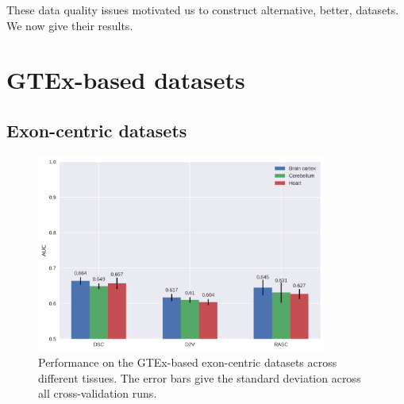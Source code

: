 These data quality issues motivated us to construct alternative, better, datasets. We now give their results.













\section{GTEx-based datasets} \label{sec:gtex}
\subsection{Exon-centric datasets} \label{subsec:gtex_exon}

\begin{figure}
	\centering\includegraphics[width=0.85\textwidth]{../visualizations/ch5-results/gtex_exon_barcharts.png} 
	\caption{Performance on the GTEx-based exon-centric datasets across different tissues. The error bars give the standard deviation across all cross-validation runs. }
	\label{fig:gtex_exon_barcharts}
\end{figure}

